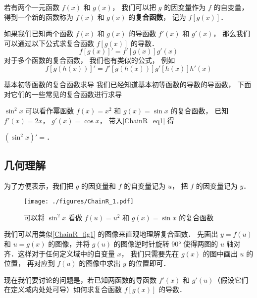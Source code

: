 
若有两个一元函数 $f(x)$ 和 $g(x)$， 我们可以把 $g$ 的因变量作为 $f$ 的自变量， 得到一个新的函数称为 $f(x)$ 和 $g(x)$ 的\textbf{复合函数}， 记为 $f[g(x)]$．

如果我们已知两个函数 $f(x)$ 和 $g(x)$ 的导函数 $f'(x)$ 和 $g'(x)$， 那么我们可以通过以下公式求复合函数 $f[g(x)]$ 的导数．
\begin{equation}\label{ChainR_eq1}
f[g(x)]' = f'[g(x)]g'(x)
\end{equation}
对于多个函数的复合函数， 我们也有类似的公式， 例如
\begin{equation}
f[g(h(x))]' = f'[g(h(x))]g'[h(x)]h'(x)
\end{equation}

\begin{example}{基本初等函数的复合函数求导}
我们已经知道基本初等函数的导数的导函数， 下面对它们的一些常见的复合函数进行求导
\begin{itemize}
$\sin^2 x$ 可以看作幂函数 $f(x) = x^2$ 和 $g(x) = \sin x$ 的复合函数， 已知 $f'(x) = 2x$， $g'(x) = \cos x$， 带入\autoref{ChainR_eq1} 得

$(\sin^2 x)' = $．
\end{itemize}

\end{example}

\subsection{几何理解}
为了方便表示，我们把 $g$ 的因变量和 $f$ 的自变量记为 $u$， 把 $f$ 的因变量记为 $y$．

\begin{figure}[ht]
\centering
\texttt{[image: ./figures/ChainR\_1.pdf]}
\caption{可以将 $\sin^2 x$ 看做 $f(u) = u^2$ 和 $g(x) = \sin x$ 的复合函数}\label{ChainR_fig1}
\end{figure}

我们可以用类似\autoref{ChainR_fig1} 的图像来直观地理解复合函数． 先画出 $y = f(u)$ 和 $u = g(x)$ 的图像，并将 $g(u)$ 的图像逆时针旋转 90° 使得两图的 $u$ 轴对齐．这样对于任何定义域中的自变量 $x$， 我们只需要先在 $g(x)$ 的图中画出 $u$ 的位置， 再对应到 $f(u)$ 的图像中求出 $y$ 的位置即可． 

现在我们要讨论的问题是，若已知两函数的导函数 $f'(x)$ 和 $g'(u)$（假设它们在定义域内处处可导）如何求复合函数 $f[g(x)]$ 的导数．

